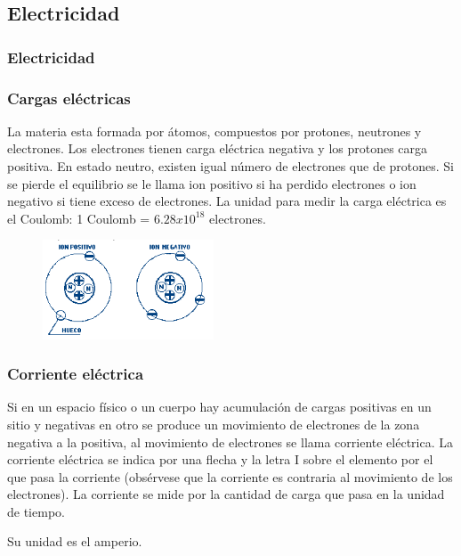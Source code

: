 \documentclass{beamer}
\begin{document}
\subsection{Electricidad}
\begin{frame}
\frametitle{Electricidad}

\end{frame}

\begin{frame}
\frametitle{Cargas eléctricas}

La materia esta formada por átomos, compuestos por protones, neutrones y electrones. Los electrones tienen carga eléctrica negativa y los protones carga positiva. En estado neutro, existen igual número de electrones que de protones. Si se pierde el equilibrio se le llama ion positivo si ha perdido electrones o ion negativo si tiene exceso de electrones. La unidad para medir la carga eléctrica es el Coulomb:
1 Coulomb = $6.28x10^{18}$ electrones.

\begin{figure}[!h]
\centering
\includegraphics[width=2in]{cargas}
\end{figure}

\end{frame}

\begin{frame}
\frametitle{Corriente eléctrica}

Si en un espacio físico o un cuerpo hay acumulación de cargas positivas en un sitio y negativas en otro se produce un movimiento de electrones de la zona negativa a la positiva, al movimiento de electrones se llama corriente eléctrica. La corriente eléctrica se indica por una flecha y la letra I sobre el elemento por el que pasa la corriente (obsérvese que la corriente es contraria al movimiento de los electrones). La corriente se mide por la cantidad de carga que pasa en la unidad de tiempo.

Su unidad es el amperio.

\end{frame}
\end{document}
